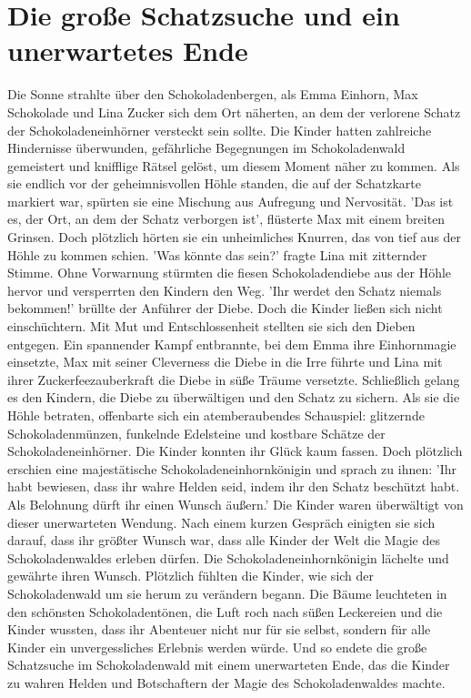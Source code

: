 \documentclass[12pt]{article} %
\begin{document}
\section{ Die große Schatzsuche und ein unerwartetes Ende }
\begin{minipage}{\textwidth}
    Die Sonne strahlte über den Schokoladenbergen, als Emma Einhorn, Max Schokolade und Lina Zucker sich dem Ort näherten, an dem der verlorene Schatz der Schokoladeneinhörner versteckt sein sollte. Die Kinder hatten zahlreiche Hindernisse überwunden, gefährliche Begegnungen im Schokoladenwald gemeistert und knifflige Rätsel gelöst, um diesem Moment näher zu kommen. Als sie endlich vor der geheimnisvollen Höhle standen, die auf der Schatzkarte markiert war, spürten sie eine Mischung aus Aufregung und Nervosität. 'Das ist es, der Ort, an dem der Schatz verborgen ist', flüsterte Max mit einem breiten Grinsen. Doch plötzlich hörten sie ein unheimliches Knurren, das von tief aus der Höhle zu kommen schien. 'Was könnte das sein?' fragte Lina mit zitternder Stimme. Ohne Vorwarnung stürmten die fiesen Schokoladendiebe aus der Höhle hervor und versperrten den Kindern den Weg. 'Ihr werdet den Schatz niemals bekommen!' brüllte der Anführer der Diebe. Doch die Kinder ließen sich nicht einschüchtern. Mit Mut und Entschlossenheit stellten sie sich den Dieben entgegen. Ein spannender Kampf entbrannte, bei dem Emma ihre Einhornmagie einsetzte, Max mit seiner Cleverness die Diebe in die Irre führte und Lina mit ihrer Zuckerfeezauberkraft die Diebe in süße Träume versetzte. Schließlich gelang es den Kindern, die Diebe zu überwältigen und den Schatz zu sichern. Als sie die Höhle betraten, offenbarte sich ein atemberaubendes Schauspiel: glitzernde Schokoladenmünzen, funkelnde Edelsteine und kostbare Schätze der Schokoladeneinhörner. Die Kinder konnten ihr Glück kaum fassen. Doch plötzlich erschien eine majestätische Schokoladeneinhornkönigin und sprach zu ihnen: 'Ihr habt bewiesen, dass ihr wahre Helden seid, indem ihr den Schatz beschützt habt. Als Belohnung dürft ihr einen Wunsch äußern.' Die Kinder waren überwältigt von dieser unerwarteten Wendung. Nach einem kurzen Gespräch einigten sie sich darauf, dass ihr größter Wunsch war, dass alle Kinder der Welt die Magie des Schokoladenwaldes erleben dürfen. Die Schokoladeneinhornkönigin lächelte und gewährte ihren Wunsch. Plötzlich fühlten die Kinder, wie sich der Schokoladenwald um sie herum zu verändern begann. Die Bäume leuchteten in den schönsten Schokoladentönen, die Luft roch nach süßen Leckereien und die Kinder wussten, dass ihr Abenteuer nicht nur für sie selbst, sondern für alle Kinder ein unvergessliches Erlebnis werden würde. Und so endete die große Schatzsuche im Schokoladenwald mit einem unerwarteten Ende, das die Kinder zu wahren Helden und Botschaftern der Magie des Schokoladenwaldes machte.
\end{minipage}
\end{document}
